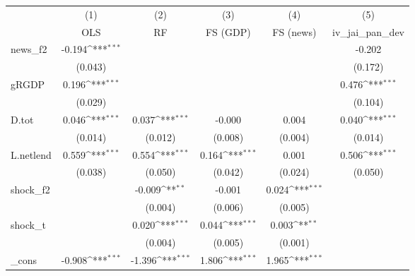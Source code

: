 {
\def\sym#1{\ifmmode^{#1}\else\(^{#1}\)\fi}
\begin{tabular}{l*{5}{c}}
\toprule
            &\multicolumn{1}{c}{(1)}&\multicolumn{1}{c}{(2)}&\multicolumn{1}{c}{(3)}&\multicolumn{1}{c}{(4)}&\multicolumn{1}{c}{(5)}\\
            &\multicolumn{1}{c}{OLS}&\multicolumn{1}{c}{RF}&\multicolumn{1}{c}{FS (GDP)}&\multicolumn{1}{c}{FS (news)}&\multicolumn{1}{c}{iv\_jai\_pan\_dev}\\
\midrule
news\_f2     &      -0.194\sym{***}&                     &                     &                     &      -0.202         \\
            &     (0.043)         &                     &                     &                     &     (0.172)         \\
\addlinespace
gRGDP       &       0.196\sym{***}&                     &                     &                     &       0.476\sym{***}\\
            &     (0.029)         &                     &                     &                     &     (0.104)         \\
\addlinespace
D.tot       &       0.046\sym{***}&       0.037\sym{***}&      -0.000         &       0.004         &       0.040\sym{***}\\
            &     (0.014)         &     (0.012)         &     (0.008)         &     (0.004)         &     (0.014)         \\
\addlinespace
L.netlend   &       0.559\sym{***}&       0.554\sym{***}&       0.164\sym{***}&       0.001         &       0.506\sym{***}\\
            &     (0.038)         &     (0.050)         &     (0.042)         &     (0.024)         &     (0.050)         \\
\addlinespace
shock\_f2    &                     &      -0.009\sym{**} &      -0.001         &       0.024\sym{***}&                     \\
            &                     &     (0.004)         &     (0.006)         &     (0.005)         &                     \\
\addlinespace
shock\_t     &                     &       0.020\sym{***}&       0.044\sym{***}&       0.003\sym{**} &                     \\
            &                     &     (0.004)         &     (0.005)         &     (0.001)         &                     \\
\addlinespace
\_cons      &      -0.908\sym{***}&      -1.396\sym{***}&       1.806\sym{***}&       1.965\sym{***}&                     \\

\end{tabular}}

